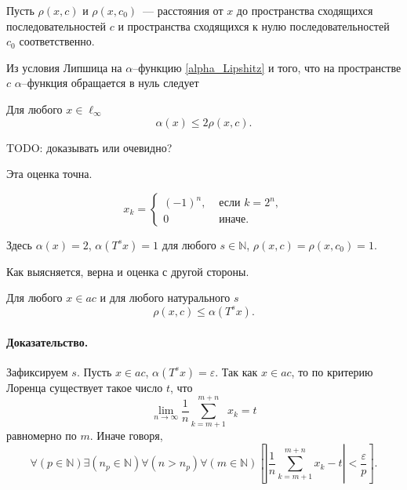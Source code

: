 Пусть $\rho(x,c)$ и $\rho(x,c_0)$~--- расстояния от $x$ до пространства сходящихся последовательностей $c$
и пространства сходящихся к нулю последовательностей $c_0$ соответственно.

Из условия Липшица на $\alpha$--функцию \eqref{alpha_Lipshitz}
и того, что на пространстве $c$
$\alpha$--функция обращается в нуль следует

\begin{lemma}
\label{thm:alpha_x_leq_2_rho_x_c}
	Для любого $x\in\ell_\infty$
	\begin{equation}
		\alpha(x) \leq 2\rho(x, c)
		.
	\end{equation}
\end{lemma}

TODO: доказывать или очевидно?

Эта оценка точна.
\begin{example}
\label{ex:alpha_ac_rho_x_c}
	\begin{equation}
	\label{eq:alpha_ac_distance_example_y}
		x_k = \begin{cases}
			(-1)^n, &\mbox{~если~} k = 2^n,
			\\
			0 &\mbox{~иначе.}
		\end{cases}
	\end{equation}
\end{example}
Здесь $\alpha(x) = 2$, $\alpha(T^s x) = 1$ для любого $s\in\mathbb{N}$, $\rho(x,c) = \rho(x, c_0) = 1$.

Как выясняется, верна и оценка с другой стороны.

\begin{lemma}
\label{thm:rho_x_c_leq_alpha_t_s_x}
	Для любого $x\in ac$ и для любого натурального $s$
	\begin{equation}
		\rho(x,c)\leq \alpha(T^s x)
		.
	\end{equation}
\end{lemma}
\paragraph{Доказательство.}
Зафиксируем $s$.
Пусть $x\in ac$, $\alpha(T^s x)=\varepsilon$.
Так как $x\in ac$, то по критерию Лоренца существует такое число $t$,
что
\begin{equation}
	\lim_{n\to\infty} \frac{1}{n} \sum_{k=m+1}^{m+n} x_k = t
\end{equation}
равномерно по $m$.
Иначе говоря,
\begin{equation}
	\forall(p\in\mathbb{N})
	\exists(n_p \in\mathbb{N})\forall(n>n_p)\forall(m\in\mathbb{N})
	\left[
		\left|
			\frac{1}{n}\sum_{k=m+1}^{m+n} x_k
			-t
		\right|
		<\frac{\varepsilon}{p}
	\right]
	.
\end{equation}

